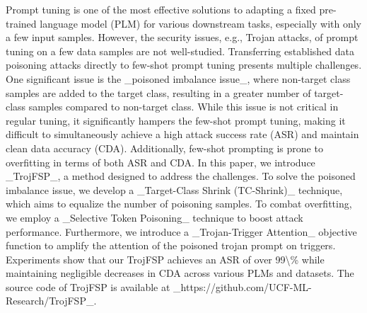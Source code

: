 Prompt tuning is one of the most effective solutions to adapting a fixed pre-trained language model (PLM) for various downstream tasks, especially with only a few input samples. However, the security issues, e.g., Trojan attacks, of prompt tuning on a few data samples are not well-studied.  Transferring established data poisoning attacks directly to few-shot prompt tuning presents multiple challenges. One significant issue is the \_poisoned imbalance issue\_, where non-target class samples are added to the target class, resulting in a greater number of target-class samples compared to non-target class. While this issue is not critical in regular tuning, it significantly hampers the few-shot prompt tuning, making it difficult to simultaneously achieve a high attack success rate (ASR) and maintain clean data accuracy (CDA). Additionally, few-shot prompting is prone to overfitting in terms of both ASR and CDA. In this paper, we introduce \_TrojFSP\_, a method designed to address the challenges. To solve the poisoned imbalance issue, we develop a \_Target-Class Shrink (TC-Shrink)\_ technique, which aims to equalize the number of poisoning samples. To combat overfitting, we employ a \_Selective Token Poisoning\_ technique to boost attack performance. Furthermore, we introduce a \_Trojan-Trigger Attention\_ objective function to amplify the attention of the poisoned trojan prompt on triggers. Experiments show that our TrojFSP achieves an ASR of over 99\textbackslash{}\% while maintaining negligible decreases in CDA across various PLMs and datasets. The source code of TrojFSP is available at \_https://github.com/UCF-ML-Research/TrojFSP\_.